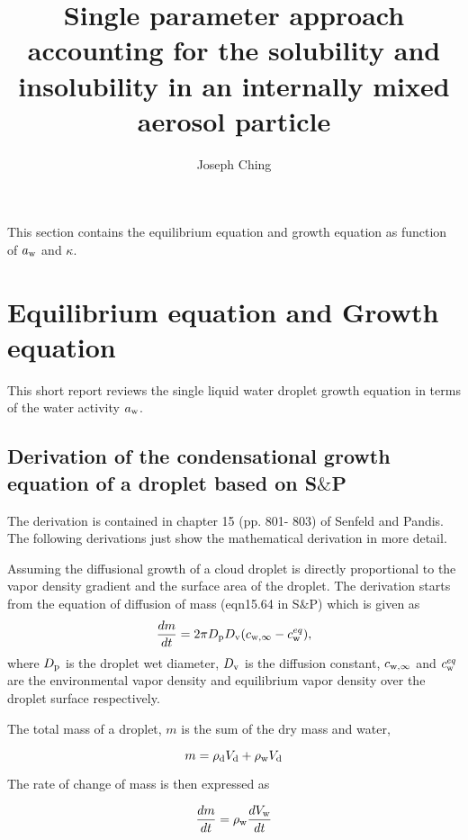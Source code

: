 \documentclass[12pt]{article}
\title{Single parameter approach accounting for the solubility and insolubility in an internally mixed aerosol particle}
\author{Joseph Ching}
\begin{document}
\maketitle
\tableofcontents


This section contains the equilibrium equation and growth equation as function of $a_{\rm w}$ and $\kappa$. 


\section{Equilibrium equation and Growth equation}

This short report reviews the single liquid water droplet growth equation in terms of the 
water activity $a_{\rm w}$. 

\subsection{Derivation of the condensational growth equation of a droplet based on S$\&$P}

The derivation is contained in chapter 15 (pp. 801- 803) of Senfeld and Pandis. The following derivations just show the mathematical derivation in more detail.

Assuming the diffusional growth of a cloud droplet is directly proportional to the vapor density gradient and the surface area of the droplet. The derivation starts from the equation of diffusion of mass (eqn15.64 in S$\&$P) which is given as
\begin{equation}\label{eqn:SP1}
\frac{dm}{dt}=2 \pi D_{\rm p} D_{\rm v} (c_{\rm w, \infty} - c_{\rm w}^{eq}),  
\end{equation}
where $D_{\rm p}$ is the droplet wet diameter, $D_{\rm v}$ is the diffusion constant, $c_{\rm w, \infty}$ and $c^{eq}_{\rm w}$ are the environmental vapor density and equilibrium vapor density over the droplet surface respectively.

The total mass of a droplet, $m$ is the sum of the dry mass and water,

\begin{equation}\label{eqn:1.1}
m=\rho_{\rm d}V_{\rm d}+\rho_{\rm w}V_{\rm d}
\end{equation}
 
The rate of change of mass is then expressed as

\begin{equation}\label{eqn:1.2}
\frac{dm}{dt}=\rho_{\rm w} \frac{dV_{\rm w}}{dt} 
\end{equation}
\end{document}
